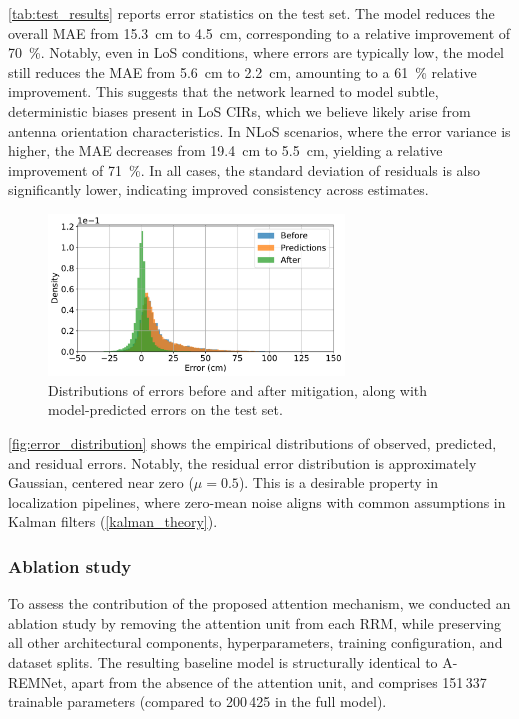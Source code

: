 \autoref{tab:test_results} reports error statistics on the test set. The model reduces the overall MAE from \SI{15.3}{\centi\metre} to \SI{4.5}{\centi\metre}, corresponding to a relative improvement of \SI{70}{\percent}. Notably, even in LoS conditions, where errors are typically low, the model still reduces the MAE from \SI{5.6}{\centi\metre} to \SI{2.2}{\centi\metre}, amounting to a \SI{61}{\percent} relative improvement. This suggests that the network learned to model subtle, deterministic biases present in LoS CIRs, which we believe likely arise from antenna orientation characteristics. In NLoS scenarios, where the error variance is higher, the MAE decreases from \SI{19.4}{\centi\metre} to \SI{5.5}{\centi\metre}, yielding a relative improvement of \SI{71}{\percent}. In all cases, the standard deviation of residuals is also significantly lower, indicating improved consistency across estimates.

\begin{figure}[tbh] 
\centering 
\includegraphics[width=0.7\textwidth]{Figures/experiments_and_results/model_error_distribution.pdf} 
\caption[Distributions of errors before and after mitigation.]{Distributions of errors before and after mitigation, along with model-predicted errors on the test set.} \label{fig:error_distribution} 
\end{figure}

\autoref{fig:error_distribution} shows the empirical distributions of observed, predicted, and residual errors. Notably, the residual error distribution is approximately Gaussian, centered near zero ($\mu = 0.5$). This is a desirable property in localization pipelines, where zero-mean noise aligns with common assumptions in Kalman filters (\autoref{kalman_theory}).

\subsubsection{Ablation study}
To assess the contribution of the proposed attention mechanism, we conducted an ablation study by removing the attention unit from each RRM, while preserving all other architectural components, hyperparameters, training configuration, and dataset splits. The resulting baseline model is structurally identical to A-REMNet, apart from the absence of the attention unit, and comprises 151\,337 trainable parameters (compared to 200\,425 in the full model).

